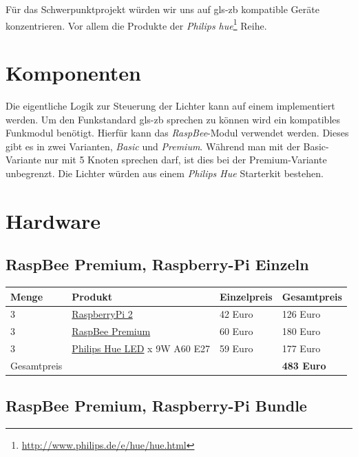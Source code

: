 \documentclass[a4paper,12pt]{article}
\begin{document}
Für das Schwerpunktprojekt würden wir uns auf \gls{gls-zb} kompatible Geräte
konzentrieren. Vor allem die Produkte der
\textit{Philips hue}\footnote{\url{http://www.philips.de/e/hue/hue.html}} Reihe.

\section{Komponenten}
\label{components}

Die eigentliche Logik zur Steuerung der Lichter kann auf einem
\emph{} implementiert werden. Um den Funkstandard \gls{gls-zb}
sprechen zu können wird ein kompatibles Funkmodul benötigt. Hierfür kann das \textit{RaspBee}-Modul
verwendet werden.
Dieses gibt es in zwei Varianten, \textit{Basic} und \textit{Premium}. Während man mit der
Basic-Variante nur mit 5 Knoten sprechen darf, ist dies bei der Premium-Variante
unbegrenzt. Die Lichter würden aus einem \textit{Philips Hue} Starterkit bestehen.

\section{Hardware}
\label{hardware}

\subsection{RaspBee Premium, Raspberry-Pi Einzeln}

\begin{tabular}{p{2cm}p{4.5cm}p{3cm}p{3cm}}
   Menge & Produkt & Einzelpreis & Gesamtpreis\\
   \hline
   3 & \href{http://www.conrad.de/ce/de/product/1316978/Raspberry-Pi-2-Model-B-1-GB-ohne-Betriebssystem}{RaspberryPi 2} & 42 Euro & 126 Euro\\
   3 & \href{http://www.conrad.de/ce/de/product/1369407/Raspberry-Pi-Erweiterungs-Platine-Zigbee-200-Knotenpunkte-Raspberry-Pi}{RaspBee Premium} & 60 Euro & 180 Euro\\
   3 & \href{http://www.conrad.de/ce/de/product/1314141/Philips-Hue-LED-Leuchtmittel-Erweiterung-E27-9-W-RGB}{Philips Hue LED}
        \newline 1 x 9W A60 E27 & 59 Euro & 177 Euro\\
   \hline
   Gesamtpreis & & & \textbf{483 Euro}\\
\end{tabular}

\subsection{RaspBee Premium, Raspberry-Pi Bundle}
\end{document}
